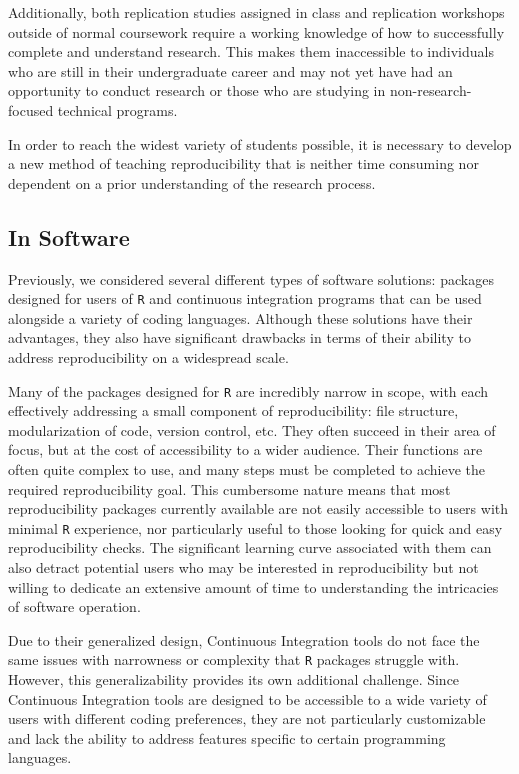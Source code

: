 \documentclass[12pt,twoside]{reedthesis}
\begin{document}
Additionally, both replication studies assigned in class and replication workshops outside of normal coursework require a working knowledge of how to successfully complete and understand research. This makes them inaccessible to individuals who are still in their undergraduate career and may not yet have had an opportunity to conduct research or those who are studying in non-research-focused technical programs.

In order to reach the widest variety of students possible, it is necessary to develop a new method of teaching reproducibility that is neither time consuming nor dependent on a prior understanding of the research process.

\hypertarget{in-software}{%
\subsection{In Software}\label{in-software}}

Previously, we considered several different types of software solutions: packages designed for users of \texttt{R} and continuous integration programs that can be used alongside a variety of coding languages. Although these solutions have their advantages, they also have significant drawbacks in terms of their ability to address reproducibility on a widespread scale.

Many of the packages designed for \texttt{R} are incredibly narrow in scope, with each effectively addressing a small component of reproducibility: file structure, modularization of code, version control, etc. They often succeed in their area of focus, but at the cost of accessibility to a wider audience. Their functions are often quite complex to use, and many steps must be completed to achieve the required reproducibility goal. This cumbersome nature means that most reproducibility packages currently available are not easily accessible to users with minimal \texttt{R} experience, nor particularly useful to those looking for quick and easy reproducibility checks. The significant learning curve associated with them can also detract potential users who may be interested in reproducibility but not willing to dedicate an extensive amount of time to understanding the intricacies of software operation.

Due to their generalized design, Continuous Integration tools do not face the same issues with narrowness or complexity that \texttt{R} packages struggle with. However, this generalizability provides its own additional challenge. Since Continuous Integration tools are designed to be accessible to a wide variety of users with different coding preferences, they are not particularly customizable and lack the ability to address features specific to certain programming languages.
\end{document}
